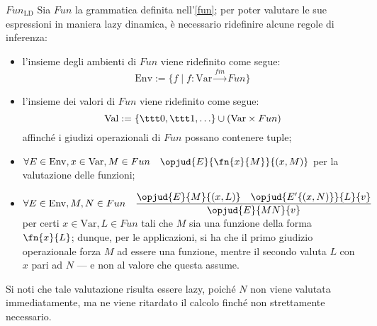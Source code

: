 \documentclass[a4paper, 12pt]{report}
\begin{document}
    \begin{framedprop}{$Fun_\mathrm{LD}$}
        Sia $Fun$ la grammatica definita nell'\cref{fun}; per poter valutare le sue espressioni in maniera lazy dinamica, è necessario ridefinire alcune regole di inferenza:

        \begin{itemize}
            \item l'insieme degli ambienti di $Fun$ viene ridefinito come segue: $$\mathrm{Env} := \{ f \mid f: \mathrm{Var} \xrightarrow{fin} Fun \}$$
            \item l'insieme dei valori di $Fun$ viene ridefinito come segue: $$\mathrm{Val} := \{ \ttt 0, \ttt 1, \ldots \} \cup (\mathrm{Var} \times Fun)$$ affinché i giudizi operazionali di $Fun$ possano contenere tuple;
            \item $\forall E \in \mathrm{Env}, x \in \mathrm{Var}, M \in Fun \quad \opjud{E}{\fn{x}{M}}{(x,M)}$ per la valutazione delle funzioni;
            \item $\forall E \in \mathrm{Env}, M,N \in Fun \quad \dfrac{\opjud{E}{M}{(x,L)} \quad \opjud{E'\{(x,N)\}}{L}{v}}{\opjud{E}{MN}{v}}$ per certi $x \in \mathrm{Var}, L \in Fun$ tali che $M$ sia una funzione della forma $\fn{x}{L}$; dunque, per le applicazioni, si ha che il primo giudizio operazionale forza $M$ ad essere una funzione, mentre il secondo valuta $L$ con $x$ pari ad $N$ --- e non al valore che questa assume.
        \end{itemize}

        Si noti che tale valutazione risulta essere lazy, poiché $N$ non viene valutata immediatamente, ma ne viene ritardato il calcolo finché non strettamente necessario.
    \end{framedprop}
\end{document}
